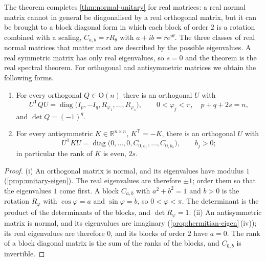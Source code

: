 The theorem completes \cref{thm:normal-unitary} for real matrices: a real normal matrix cannot in general be diagonalised by a real orthogonal matrix, but it can be brought to a block diagonal form in which each block of order $2$ is a rotation combined with a scaling, $C_{a,b}=rR_\theta$ with $a+ib=re^{i\theta}$. The three classes of real normal matrices that matter most are described by the possible eigenvalues. A real symmetric matrix has only real eigenvalues, so $s=0$ and the theorem is the real spectral theorem. For orthogonal and antisymmetric matrices we obtain the following forms.

\begin{corollary}
\label{cor:orthogonal-form}
\leavevmode
\begin{enumerate}
\item For every orthogonal $Q\in\mathrm O(n)$ there is an orthogonal $U$ with
\[
U^{\mathsf T}QU=\operatorname{diag}\bigl(I_p,-I_q,R_{\varphi_1},\ldots,R_{\varphi_s}\bigr),\qquad0<\varphi_j<\pi,\quad p+q+2s=n,
\]
and $\det Q=(-1)^q$.
\item For every antisymmetric $K\in\mathbb R^{n\times n}$, $K^{\mathsf T}=-K$, there is an orthogonal $U$ with
\[
U^{\mathsf T}KU=\operatorname{diag}\bigl(0,\ldots,0,C_{0,b_1},\ldots,C_{0,b_s}\bigr),\qquad b_j>0 ;
\]
in particular the rank of $K$ is even, $2s$.
\end{enumerate}
\end{corollary}

\begin{proof}
(i) An orthogonal matrix is normal, and its eigenvalues have modulus $1$ (\cref{prop:unitary-eigen}). The real eigenvalues are therefore $\pm1$; order them so that the eigenvalues $1$ come first. A block $C_{a,b}$ with $a^2+b^2=1$ and $b>0$ is the rotation $R_\varphi$ with $\cos\varphi=a$ and $\sin\varphi=b$, so $0<\varphi<\pi$. The determinant is the product of the determinants of the blocks, and $\det R_\varphi=1$. (ii) An antisymmetric matrix is normal, and its eigenvalues are imaginary (\cref{prop:hermitian-eigen}\,(iv)); its real eigenvalues are therefore $0$, and its blocks of order $2$ have $a=0$. The rank of a block diagonal matrix is the sum of the ranks of the blocks, and $C_{0,b}$ is invertible.
\end{proof}

